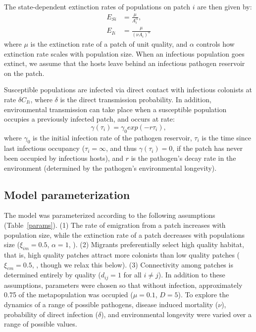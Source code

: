 \documentclass{article}
\begin{document}
The state-dependent extinction rates of populations on patch $i$ are then given by:
\begin{align}
E_{Si} & =\frac{\mu}{A_i^\alpha},\\
E_{Ii} & = \frac{\mu}{(\nu A_i) ^ \alpha}
\end{align}
where $\mu$ is the extinction rate of a patch of unit quality, and $\alpha$ controls how extinction rate scales with population size.  When an infectious population goes extinct, we assume that the hosts leave behind an infectious pathogen reservoir on the patch.  

Susceptible populations are infected via direct contact with infectious colonists at rate $\delta C_{Ii}$, where $\delta$ is the direct transmission probability.  In addition, environmental transmission can take place when a susceptible population occupies a previously infected patch, and occurs at rate:
\begin{equation}
\gamma(\tau_i)=\gamma_0exp(-r\tau_{i}),
\end{equation}
where $\gamma_0$ is the initial infection rate of the pathogen reservoir, $\tau_{i}$ is the time since last infectious occupancy ($\tau_{i} = \infty$, and thus $\gamma(\tau_i) = 0$, if the patch has never been occupied by infectious hosts), and $r$ is the pathogen's decay rate in the environment (determined by the pathogen's environmental longevity).

\subsection{Model parameterization}

The model was parameterized  according to the following assumptions (Table~\ref{params}). (1) The rate of emigration from a patch increases with population size, while the extinction rate of a patch decreases with populations size ($\xi_{im}=0.5$, $\alpha=1$, \cite{Hanski2003}).  (2) Migrants preferentially select high quality habitat, that is, high quality patches attract more colonists than low quality patches ($\xi_{em}=0.5$, \cite{Hanski2003}, though we relax this below).  (3)  Connectivity among patches is determined entirely by quality ($d_{ij}=1$ for all $i \neq j$).  In addition to these assumptions, parameters were chosen so that without infection, approximately 0.75 of the metapopulation was occupied ($\mu = 0.1$, $D=5$).  To explore the dynamics of a range of possible pathogens, disease induced mortality ($\nu$), probability of direct infection ($\delta$), and environmental longevity were varied over a range of possible values.
\end{document}
